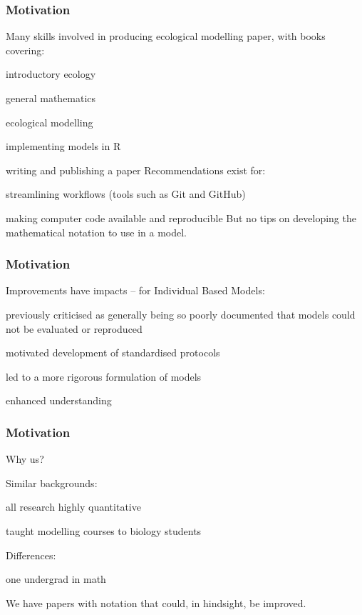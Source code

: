 
\begin{frame}
\frametitle{Motivation}
Many skills involved in producing ecological modelling paper, with books covering:
\bi
\item introductory ecology
\item general mathematics
\item ecological modelling
\item implementing models in R
\item writing and publishing a paper
\ei
  Recommendations exist for:
\bi
\item streamlining workflows (tools such as Git and GitHub)
\item making computer code available and reproducible
\ei
But no tips on developing the mathematical notation to use in a model.

\end{frame}


\begin{frame}
\frametitle{Motivation}

Improvements have impacts -- for Individual Based Models:

\bi
\item previously criticised as generally being so poorly documented
that models could not be evaluated or reproduced
\item motivated development of standardised protocols
\item led to a more rigorous formulation of models
\item enhanced understanding
\ei
\end{frame}


\begin{frame}
\frametitle{Motivation}

Why us?

\medskip

Similar backgrounds:
\bi
\item all research highly quantitative
\item {}
\item taught modelling courses to biology students
\ei

\medskip
Differences:
\bi
\item one undergrad in math
\item {}
\ei

\medskip

We have papers with notation that could, in hindsight, be improved.

\end{frame}


